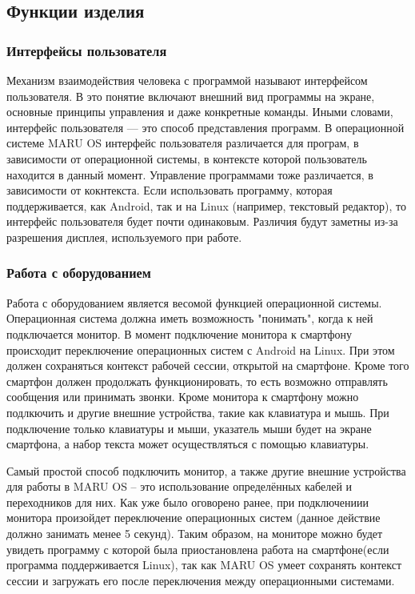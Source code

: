 \documentclass[a4paper, 14pt]{article}
\begin{document}

\subsection{Функции изделия }

\subsubsection{Интерфейсы пользователя}
\par Механизм взаимодействия человека с программой называют интерфейсом пользователя. В это понятие включают внешний вид программы на экране, основные принципы управления и даже конкретные команды. Иными словами, интерфейс пользователя — это способ представления программ. В операционной системе MARU OS интерфейс пользователя различается для програм, в зависимости от операционной системы, в контексте которой пользователь находится в данный момент. Управление программами тоже различается, в зависимости от кокнтекста. Если использовать программу, которая поддерживается, как Android, так и на Linux (например, текстовый редактор), то интерфейс пользователя будет почти одинаковым. Различия будут заметны из-за разрешения дисплея, используемого при работе.


\subsubsection{Работа с оборудованием}

\par Работа с оборудованием является весомой функцией операционной системы. Операционная система должна иметь возможность "понимать", когда к ней подключается монитор. В момент подключение монитора к смартфону происходит переключение операционных систем с Android на Linux. При этом должен сохраняться контекст рабочей сессии, открытой на смартфоне. Кроме того смартфон должен продолжать функционировать, то есть возможно отправлять сообщения или принимать звонки. Кроме монитора к смартфону можно подлкючить и другие внешние устройства, такие как клавиатура и мышь. При подключение только клавиатуры и мыши, указатель мыши будет на экране смартфона, а набор текста может осуществляться с помощью клавиатуры. 

\par Самый простой способ подключить монитор, а также другие внешние устройства для работы в MARU OS -- это использование определённых кабелей и переходников для них. Как уже было оговорено ранее, при подключениии монитора произойдет переключение операционных систем (данное действие должно занимать менее 5 секунд). Таким образом, на мониторе можно будет увидеть программу с которой была приостановлена работа на смартфоне(если программа поддерживается Linux), так как MARU OS умеет сохранять контекст сессии и загружать его после переключения между операционными системами. 
\end{document}
